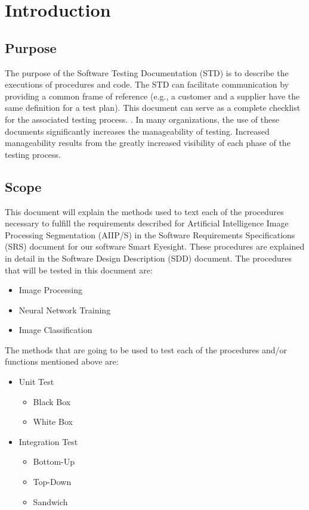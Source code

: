 \documentclass[12pt]{article}
\begin{document}
\section{Introduction}

\subsection{Purpose}

 The purpose of the Software Testing Documentation (STD) is to describe the executions of procedures and code. The STD can facilitate communication by providing a common frame of reference (e.g., a customer and a supplier have the same definition for a test plan).  This document can serve as a complete checklist for the associated testing process. . In many organizations, the use of these documents significantly increases the manageability of testing. Increased manageability results from the greatly increased visibility of each phase of the testing process.



\subsection{Scope}

This document will explain the methods used to text each of the procedures necessary to fulfill the requirements described for Artificial Intelligence Image Processing Segmentation (AIIP/S) in the Software Requirements Specifications (SRS) document for our software Smart Eyesight. These procedures are explained in detail in the Software Design Description (SDD) document. The procedures that will be tested in this document are:

\begin{itemize}
  \item Image Processing
  \item Neural Network Training
  \item Image Classification
\end{itemize}

The methods that are going to be used to test each of the procedures and/or functions mentioned above are:
\begin{itemize}
  \item Unit Test
    \begin{itemize}
  \item Black Box
  \item White Box
    \end{itemize}
  \item Integration Test
   \begin{itemize}
  \item Bottom-Up
  \item Top-Down
  \item Sandwich
    \end{itemize}
\end{itemize}
\end{document}

